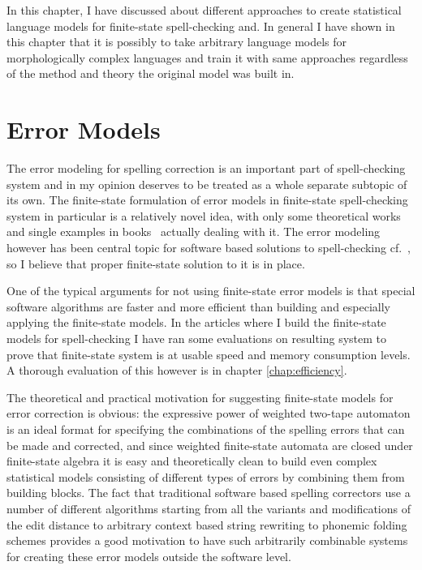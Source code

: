 \documentclass[officiallayout]{unihelcompling}
\begin{document}
In this chapter, I have discussed about different approaches to create
statistical language models for finite-state spell-checking and.  In general I
have shown in this chapter that it is possibly to take arbitrary language
models for morphologically complex languages and train it with same approaches
regardless of the method and theory the original model was built in.


\chapter{Error Models}
\label{chap:error-models}

The error modeling for spelling correction is an important part of
spell-checking system and in my opinion deserves to be treated as a whole
separate subtopic of its own. The finite-state formulation of error models in
finite-state spell-checking system in particular is a relatively novel idea,
with only some theoretical works \citep{agata2002typographical,mohri2003edit}
and single examples in books~\citep{beesley2003finite} actually dealing with
it.  The error modeling however has been central topic for software based
solutions to spell-checking
cf.~\citet{deorowicz2005correcting,kukich1992spelling,mitton2009ordering,deorowicz2005correcting},
so I believe that proper finite-state solution to it is in place.

One of the typical arguments for not using finite-state error models is that
special software algorithms are faster and more efficient than building and
especially applying the finite-state models. In the articles where I build
the finite-state models for spell-checking I have ran some evaluations on
resulting system to prove that finite-state system is at usable speed
and memory consumption levels. A thorough evaluation of this however
is in chapter \ref{chap:efficiency}.

The theoretical and practical motivation for suggesting finite-state models for
error correction is obvious: the expressive power of weighted two-tape
automaton is an ideal format for specifying the combinations of the spelling
errors that can be made and corrected, and since weighted finite-state automata
are closed under finite-state algebra it is easy and theoretically clean to
build even complex statistical models consisting of different types of errors
by combining them from building blocks. The fact that traditional software
based spelling correctors use a number of different algorithms starting from
all the variants and modifications of the edit distance to arbitrary context
based string rewriting to phonemic folding schemes provides a good motivation
to have such arbitrarily combinable systems for creating these error models
outside the software level.
\end{document}

